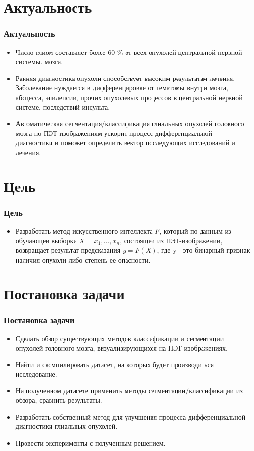 \section{Актуальность}
\begin{frame}
    \frametitle{Актуальность}
    \begin{itemize}
        \item Число глиом составляет более 60 \% от всех опухолей центральной нервной системы.
        мозга.
        \item Ранняя диагностика опухоли способствует высоким результатам лечения. Заболевание нуждается в дифференцировке от 
        гематомы внутри мозга, абсцесса, эпилепсии, прочих опухолевых процессов в центральной нервной 
        системе, последствий инсульта.
        \item Автоматическая сегментация/классификация глиальных опухолей головного мозга по ПЭТ-изображениям
        ускорит процесс дифференциальной диагностики и поможет определить вектор последующих исследований и лечения.
        
    \end{itemize}
\end{frame}

\section{Цель}
\begin{frame}
    \frametitle{Цель}
    \begin{itemize}
        \item Разработать метод искусственного интеллекта \(F\), который по 
        данным из обучающей выборки \(X={x_1,\dots,x_n}\),
        состоящей из ПЭТ-изображений, возвращает результат предсказания \(y=F(X)\), 
        где y - это бинарный признак наличия опухоли либо степень ее опасности.
    \end{itemize}
\end{frame}

\section{Постановка задачи}
\begin{frame}
    \frametitle{Постановка задачи}
    \begin{itemize}
        \item Сделать обзор существующих методов классификации и сегментации опухолей головного мозга,
        визуализирующихся на ПЭТ-изображениях.
        \item Найти и скомпилировать датасет, на которых будет производиться исследование.
        \item На полученном датасете применить методы сегментации/классификации из обзора, 
        сравнить результаты.
        \item Разработать собственный метод для улучшения процесса дифференциальной 
        диагностики глиальных опухолей.
        \item Провести эксперименты с полученным решением.
    \end{itemize}
\end{frame}